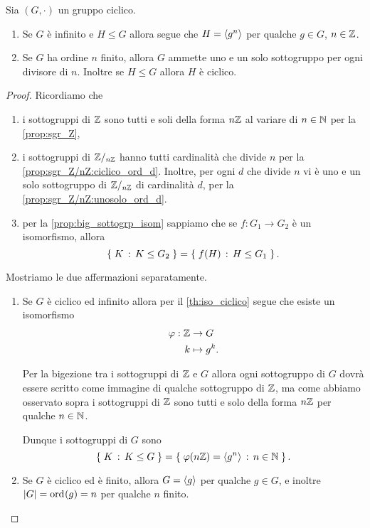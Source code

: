 \begin{corollary}
     \label{cor:sgr_gruppo_ciclico}
    Sia $(G, \cdot)$ un gruppo ciclico.
    \begin{enumerate}[label={(\roman*)}]
        \item Se $G$ è infinito e $H \leq G$ allora segue che $H = \cycl*{g^n}$ per qualche $g \in G$, $n \in \Z$.
        \item Se $G$ ha ordine $n$ finito, allora $G$ ammette uno e un solo sottogruppo per ogni divisore di $n$.
        Inoltre se $H \leq G$ allora $H$ è ciclico.
    \end{enumerate}
\end{corollary}
\begin{proof}
    Ricordiamo che \begin{enumerate}
        \item i sottogruppi di $\Z$ sono tutti e soli della forma $n\Z$ al variare di $n \in \N$ per la \autoref{prop:sgr_Z},
        \item i sottogruppi di $\Zmod{n}$ hanno tutti cardinalità che divide $n$ per la \autoref{prop:sgr_Z/nZ:ciclico_ord_d}. Inoltre, per ogni $d$ che divide $n$ vi è uno e un solo sottogruppo di $\Zmod{n}$ di cardinalità $d$, per la \autoref{prop:sgr_Z/nZ:unosolo_ord_d}.
        \item per la \autoref{prop:big_sottogrp_isom} sappiamo che se $f : G_1 \to G_2$ è un isomorfismo, allora \[
            \set{K \suchthat K \leq G_2} = \set{f(H) \suchthat H \leq G_1}. 
        \]
    \end{enumerate}

    Mostriamo le due affermazioni separatamente.
    \begin{enumerate}[label={(\roman*)}]
        \item Se $G$ è ciclico ed infinito allora per il \autoref{th:iso_ciclico} segue che esiste un isomorfismo \begin{align*}
            \phi : \Z &\to G \\
            k &\mapsto g^k.
        \end{align*}

        Per la bigezione tra i sottogruppi di $\Z$ e $G$ allora ogni sottogruppo di $G$ dovrà essere scritto come immagine di qualche sottogruppo di $\Z$, ma come abbiamo osservato sopra i sottogruppi di $\Z$ sono tutti e solo della forma $n\Z$ per qualche $n \in \N$.
        
        Dunque i sottogruppi di $G$ sono \[
            \set{K \suchthat K \leq G} = \set{\phi(n\Z) = \cycl*{g^n} \suchthat n \in \N}.    
        \]
        \item Se $G$ è ciclico ed è finito, allora $G = \cycl*{g}$ per qualche $g \in G$, e inoltre $\abs*{G} = \ord{g} = n$ per qualche $n$ finito.
        

\end{enumerate}
\end{proof}
